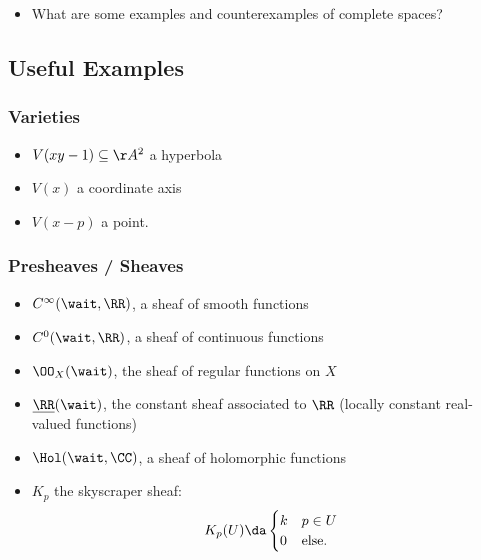 \begin{itemize}
  \begin{itemize}
  \tightlist
  \item
    What are some examples and counterexamples of complete spaces?
  \end{itemize}
\end{itemize}

\newpage

\hypertarget{useful-examples}{%
\subsection{Useful Examples}\label{useful-examples}}

\hypertarget{varieties}{%
\subsubsection{Varieties}\label{varieties}}

\begin{itemize}
\tightlist
\item
  \(V(xy-1) \subseteq \AA^2\) a hyperbola
\item
  \(V(x)\) a coordinate axis
\item
  \(V(x-p)\) a point.
\end{itemize}

\hypertarget{presheaves-sheaves}{%
\subsubsection{Presheaves / Sheaves}\label{presheaves-sheaves}}

\begin{itemize}
\tightlist
\item
  \(C^\infty(\wait, \RR)\), a sheaf of smooth functions
\item
  \(C^0(\wait, \RR)\), a sheaf of continuous functions
\item
  \(\OO_X(\wait)\), the sheaf of regular functions on \(X\)
\item
  \(\underline{\RR}(\wait)\), the constant sheaf associated to \(\RR\)
  (locally constant real-valued functions)
\item
  \(\Hol(\wait, \CC)\), a sheaf of holomorphic functions
\item
  \(K_p\) the skyscraper sheaf:
  \begin{align*}  
  K_p(U) \da 
  \begin{cases}
  k & p\in U \\
  0 & \text{else}.
  \end{cases}
  \end{align*}
\end{itemize}

